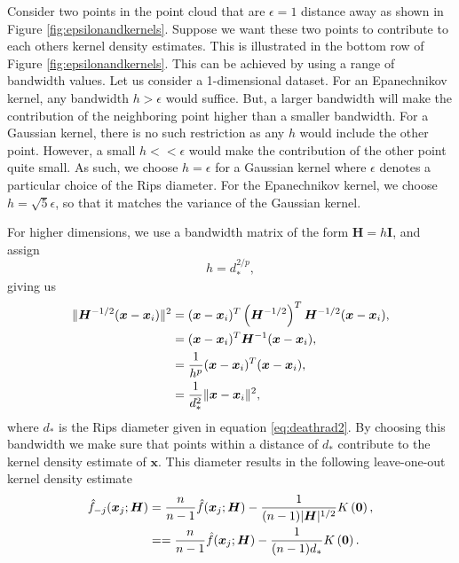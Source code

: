 \documentclass[11pt,a4paper,]{article}
\theoremstyle{definition}
\theoremstyle{definition}
\theoremstyle{definition}
\theoremstyle{remark}
\begin{document}
Consider two points in the point cloud that are \(\epsilon = 1\) distance away as shown in Figure \ref{fig:epsilonandkernels}. Suppose we want these two points to contribute to each others kernel density estimates. This is illustrated in the bottom row of Figure \ref{fig:epsilonandkernels}. This can be achieved by using a range of bandwidth values. Let us consider a 1-dimensional dataset. For an Epanechnikov kernel, any bandwidth \(h>\epsilon\) would suffice. But, a larger bandwidth will make the contribution of the neighboring point higher than a smaller bandwidth. For a Gaussian kernel, there is no such restriction as any \(h\) would include the other point. However, a small \(h < < \epsilon\) would make the contribution of the other point quite small. As such, we choose \(h=\epsilon\) for a Gaussian kernel where \(\epsilon\) denotes a particular choice of the Rips diameter. For the Epanechnikov kernel, we choose \(h = \sqrt{5} \epsilon\), so that it matches the variance of the Gaussian kernel.

For higher dimensions, we use a bandwidth matrix of the form \(\bm{H} = h\bm{I}\), and assign
\begin{equation}\label{eq:bandwidth}
    h = d_*^{2/p}  ,
\end{equation}
giving us
\begin{align}\label{eq:kde11}
    \| \bm{H}^{-1/2}(\bm{x} - \bm{x}_i) \|^2 
      & = (\bm{x} - \bm{x}_i)^T \left(\bm{H}^{-1/2}\right)^T \bm{H}^{-1/2} (\bm{x} - \bm{x}_i)  , \notag \\
      & = (\bm{x} - \bm{x}_i)^T \bm{H}^{-1} (\bm{x} - \bm{x}_i)  , \notag                                \\
      & = \frac{1}{h^p}(\bm{x} - \bm{x}_i)^T (\bm{x} - \bm{x}_i) , \notag                                \\
      & = \frac{1}{d_*^2}\|\bm{x} - \bm{x}_i \|^2  ,
\end{align}
where \(d_*\) is the Rips diameter given in equation \eqref{eq:deathrad2}. By choosing this bandwidth we make sure that points within a distance of \(d_*\) contribute to the kernel density estimate of \(\bm{x}\). This diameter results in the following leave-one-out kernel density estimate
\begin{align}\label{eq:kde12}
    \hat{f}_{-j}(\bm{x}_j;\bm{H}) 
      & = \frac{n}{n-1} \hat{f}(\bm{x}_j;\bm{H}) - \frac{1}{(n-1)|\bm{H}|^{1/2}} K\left(\bm{0}\right)  , \notag \\
      & = = \frac{n}{n-1} \hat{f}(\bm{x}_j;\bm{H}) - \frac{1}{(n-1)d_*} K\left(\bm{0}\right)  .
\end{align}
\end{document}
